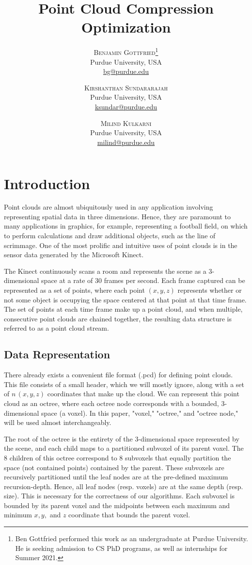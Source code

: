 \documentclass[twoside,twocolumn]{article}
\title{Point Cloud Compression Optimization} %
\author{
\textsc{Benjamin Gottfried}\thanks{Ben Gottfried performed this work as an undergraduate at Purdue
University. He is seeking admission to CS PhD programs, as well as internships for Summer 2021.}\\[1ex]
\normalsize Purdue University, USA\\
\normalsize \href{mailto:bg@purdue.edu}{bg@purdue.edu}
\and
\textsc{Kirshanthan Sundararajah}\\[1ex]
\normalsize Purdue University, USA\\
\normalsize \href{mailto:ksundar@purdue.edu}{ksundar@purdue.edu}
\and
\textsc{Milind Kulkarni}\\[1ex]
\normalsize Purdue University, USA\\
\normalsize \href{mailto:milind@purdue.edu}{milind@purdue.edu}
}
\date{} %
\begin{document}
\maketitle %


\section{Introduction} \label{sec:Introduction}

Point clouds are almost ubiquitously used in any application involving representing spatial data in three
dimensions. Hence, they are paramount to many applications in graphics, for example, representing a football
field, on which to perform calculations and draw additional objects, such as the line of scrimmage.
One of the most prolific and intuitive uses of point clouds is in the sensor data generated by the
Microsoft Kinect.

The Kinect continuously scans a room and represents the scene as a 3-dimensional space at a rate of
30 frames per second. Each frame captured can be represented as a set of points, where each point $(x,y,z)$
represents whether or not some object is occupying the space centered at that point at that time frame.
The set of points at each time frame make up a point cloud, and when multiple, consecutive point clouds
are chained together, the resulting data structure is referred to as a point cloud stream.


\subsection{Data Representation} \label{sec:Data Representation}

There already exists a convenient file format (.pcd) for defining point clouds. This file consists
of a small header, which we will mostly ignore, along with a set of $n \, (x,y,z)$ coordinates
that make up the cloud. We can represent this point cloud as an octree, where each octree node corresponds
with a bounded, 3-dimensional space (a voxel). In this paper, "voxel," "octree," and "octree node," will be
used almost interchangeably.

The root of the octree is the entirety of the 3-dimensional space represented by the scene, and each
child maps to a partitioned subvoxel of its parent voxel. The 8 children of this octree correspond to 8
subvoxels that equally partition the space (not contained points) contained by the parent. These
subvoxels are recursively partitioned until the leaf nodes are at the pre-defined maximum recursion-depth.
Hence, all leaf nodes (resp. voxels) are at the same depth (resp. size). This is necessary for the
correctness of our algorithms. Each subvoxel is bounded by its parent voxel and the midpoints between
each maximum and minimum $x, y,$ and $z$ coordinate that bounds the parent voxel.
\end{document}
